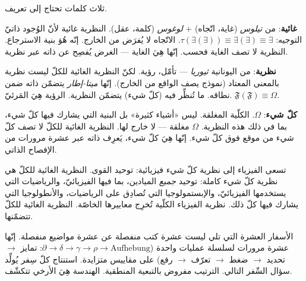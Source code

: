 \documentclass[10pt, openany, oneside]{book}
\begin{document}
\vspace{0.5em}

\noindent ثلاث كلمات تحتاج إلى تعريف.

\vspace{0.3em}

\noindent \textbf{غائية}: من \textit{تيلوس} (غاية، اتّجاه) + \textit{لوغوس} (كلمة، عقل). النظرية غائية لأنّ الوُجود ذاتيّ التوجيه: $\tau(\exists(\exists)) \equiv \exists(\exists) \equiv \exists$. الاتّجاه لا يُفرَض من الخارج. إنّه هُوَ بنية الاسترجاع. النظرية لا تصف الغاية فحسب. إنّها هِيَ الغاية --- الغرض يُفصِح عن ذاته عبر نظرية.

\vspace{0.3em}

\noindent \textbf{نظرية}: من اليونانية \textit{ثيوريا} --- تأمّل، رؤية. لكنّ النظرية الغائية للكلّ ليست نظرية بالمعنى المعتاد (نموذج يصف الواقع من الخارج). إنّها \textit{ميتا-إطار} يتضمّن ذاته ضمن نطاقه. ما تُنظِّر فيه (كلّ شيء) يتضمّن النظرية. الرؤية هِيَ المَرئيّ. $\mathfrak{F}(\mathfrak{F}) \equiv \Omega$.

\vspace{0.3em}

\noindent \textbf{كلّ شيء}: $\Omega$. الكلّية المغلقة. ليس «أشياء كثيرة» بل البنية التي يشارك فيها كلّ شيء، بما في ذلك هذه النظرية. $\Omega$ مغلقة --- لا خارج لها. النظرية الغائية للكلّ لا تصف كلّ شيء من موقع فوق كلّ شيء. إنّها هِيَ كلّ شيء، يَعرِف ذاته عبر عشرة مرورات من الإفصاح الذاتي.

\vspace{0.5em}

\noindent تسعى الفيزياء إلى نظرية كلّ شيء فيزيائية: توحيد القوى. النظرية الغائية للكلّ هي نظرية كلّ شيء كاملة: توحيد \textit{جميع} الميادين، بما فيها الفيزيائيّ، والرياضيات التي يستخدمها الفيزيائيّ، والإبستمولوجيا التي تُصادِق على الرياضيات، والأنطولوجيا التي يشارك فيها كلّ ذلك. نظرية الفيزياء الكلّية تُخرِج معاييرها الخاصّة. النظرية الغائية للكلّ تتضمّنها.

\vspace{0.5em}

\noindent الأسفار العشرة التي تلي ليست عشرة كتب منفصلة عن عشرة مواضيع منفصلة. إنّها عشرة مرورات لسلسلة عمليات واحدة ($\partial \to \delta \to \gamma \to \rho \to \text{Aufhebung}$: تمايز $\to$ تحديد $\to$ ضغط $\to$ تعرّف $\to$ رفع) على مقاييس متزايدة. استنتاج كلّ سِفر يُولِّد سؤال السِّفر التالي. الترتيب مفروض بالتبعية المنطقية. الهندسة هِيَ الأرخي تتكشّف.

\vspace{0.5em}
\end{document}
